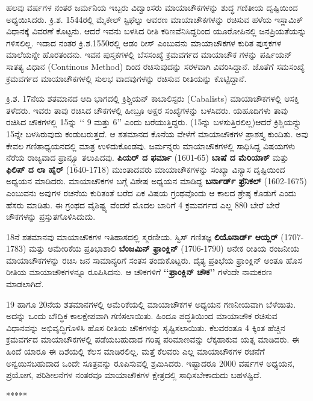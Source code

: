 ಹಲವು ವರ್ಷಗಳ ನಂತರ ಜರ್ಮನಿಯ ಇಬ್ಬರು ವಿದ್ವಾಂಸರು ಮಾಯಾಚೌಕಗಳನ್ನು ಶುದ್ಧ ಗಣಿತೀಯ ದೃಷ್ಟಿಯಿಂದ ಅಧ್ಯಯಿಸಿದರು. ಕ್ರಿ.ಶ. 1544ರಲ್ಲಿ ಮೈಕೇಲ್ ಸ್ಟಿಫೆಲ್ನು ಆವರಣ ಮಾಯಾಚೌಕಗಳನ್ನು ರಚಿಸುವ ಹಳೆಯ ಇಸ್ಲಾಮಿಕ್ ವಿಧಾನಕ್ಕೆ ವಿವರಣೆ ಕೊಟ್ಟನು. ಆದರೆ ಇವನು ಬಳಸಿದ ರೀತಿ ಕಠಿಣವೆನಿಸಿದ್ದರಿಂದ ಯೂರೋಪಿನಲ್ಲಿ ಜನಪ್ರಿಯತೆಯನ್ನು ಗಳಿಸಲಿಲ್ಲ. ಇದಾದ ನಂತರ ಕ್ರಿ.ಶ.1550ರಲ್ಲಿ ಆಡಂ ರೀಸ್ ಎಂಬುವನು ಮಾಯಾಚೌಕಗಳ ಕುರಿತ ಪುಸ್ತಕಗಳ ಮಾಲೆಯನ್ನೇ ಹೊರತಂದನು. ಇವನ ಪುಸ್ತಕಗಳಲ್ಲಿ ಬೆಸಸಂಖ್ಯೆ ಕ್ರಮವರ್ಗದ ಮಾಯಾಚೌಕ ಗಳನ್ನು ಪರ್ಷಿಯನ್ ಸಾತತ್ಯ ವಿಧಾನ (Continous Method) ದಿಂದ ರಚಿಸುವುದನ್ನು ಸರಳವಾಗಿ ವಿವರಿಸಿದ್ದಾನೆ. ಜೊತೆಗೆ ಸಮಸಂಖ್ಯೆ ಕ್ರಮವರ್ಗದ ಮಾಯಾಚೌಕಗಳಲ್ಲಿ ಸುಲಭ ವಾದವುಗಳನ್ನು ರಚಿಸುವ ರೀತಿಯನ್ನು ಕೊಟ್ಟಿದ್ದಾನೆ.

ಕ್ರಿ.ಶ. 17ನೆಯ ಶತಮಾನದ ಆದಿ ಭಾಗದಲ್ಲಿ ಕ್ರಿಶ್ಚಿಯನ್ ಕಾಬಾಲಿಸ್ಟರು (Cabalists) ಮಾಯಾಚೌಕಗಳಲ್ಲಿ ಆಸಕ್ತಿ ತಳೆದರು. ಇವರು ತಾವು ರಚಿಸಿದ ಚೌಕಗಳಲ್ಲಿ ಹೀಬ್ರೂ ಅಕ್ಷರ ಸಂಖ್ಯೆಗಳನ್ನು ಬಳಸಿದರು. ಯಹೂದಿಗಳು ತಾವು ರಚಿಸಿದ ಚೌಕಗಳಲ್ಲಿ 15ನ್ನು ‘‘ 9 ಮತ್ತು 6’’ ಎಂದು ಬರೆಯುತ್ತಿದ್ದರು. (15ನ್ನು ಬಳಸುತ್ತಿರಲಿಲ್ಲ)ಆದರೆ ಕ್ರಿಶ್ಚಿಯನ್ನ್ರು 15ನ್ನೇ ಬಳಸಿರುವುದು ಕಂಡುಬರುತ್ತದೆ. ಆ ಶತಮಾನದ ಕೊನೆಯ ವೇಳೆಗೆ ಮಾಯಾಚೌಕಗಳ ಪ್ರಾಶಸ್ತ್ಯ ಕುಂದಿತು. ಅವು ಕೇವಲ ಗಣಿತಾಧ್ಯಯನದಲ್ಲಿ ಮಾತ್ರ ಉಳಿದುಕೊಂಡವು. ಜರ್ಮನ್ನರು ಮಾಯಾಚೌಕಗಳಲ್ಲಿ ಸಾಧಿಸಿದ್ದ ವಿಷಯಗಳು ನೆರೆಯ ರಾಜ್ಯವಾದ ಫ್ರಾನ್ಸ್ಗೂ ತಲುಪಿದವು. \textbf{ಪಿಯರ್ ದ ಫರ್ಮಾ} (1601-65) \textbf{ಬಾಷೆ ದ ಮೆರಿಯಾಕ್} ಮತ್ತು \textbf{ಫಿಲಿಪ್ ದ ಲಾ ಹೈರ್} (1640-1718) ಮುಂತಾದವರು ಮಾಯಾಚೌಕಗಳನ್ನು ಸಂಖ್ಯಾ ವಿನ್ಯಾಸ ದೃಷ್ಟಿಯಿಂದ ಅಧ್ಯಯನ ಮಾಡಿದರು. ಮಾಯಾಚೌಕಗಳ ಬಗ್ಗೆ ವಿಶೇಷ ಅಧ್ಯಯನ ಮಾಡಿದ್ದ \textbf{ಬರ್ನಾರ್ಡ್ ಫ್ರೆನಿಕಲ್} (1602-1675) ಎಂಬುವನು ಅವುಗಳ ರಚನೆಯ ಕುರಿತಂತೆ ಬರೆದ ಏಕ ವಿಷಯ ಗ್ರಂಥವೊಂದು ಆ ಕಾಲದ ಶ್ರೇಷ್ಠ ಕೊಡುಗೆ ಎಂದು ಹೆಸರು ಮಾಡಿತು. ಈ ಗ್ರಂಥದ ವೈಶಿಷ್ಟ್ಯ ವೆಂದರೆ ಮೊದಲ ಬಾರಿಗೆ 4 ಕ್ರಮವರ್ಗದ ಎಲ್ಲ 880 ಬೇರೆ ಬೇರೆ ಚೌಕಗಳನ್ನು ಪ್ರಸ್ತುತಗೊಳಿಸಿದುದು.

18ನೆ ಶತಮಾನವು ಮಾಯಾಚೌಕಗಳ ಇತಿಹಾಸದಲ್ಲಿ ಸ್ಮರಣೀಯ. ಸ್ವಿಸ್ ಗಣಿತಜ್ಞ \textbf{ಲಿಯೊನಾರ್ಡ್ ಆಯ್ಲರ್} (1707-1783) ಮತ್ತು ಅಮೇರಿಕೆಯ ಪ್ರತಿಭಾಶಾಲಿ \textbf{ಬೆಂಜಮಿನ್ ಫ್ರಾಂಕ್ಲಿನ್} (1706-1790) ಅನೇಕ ರೀತಿಯ ರಂಜನೀಯ ಮಾಯಾಚೌಕಗಳನ್ನು ರಚಿಸಿ ಜನ ಸಾಮಾನ್ಯರಿಗೆ ಸಂತಸ ತಂದುಕೊಟ್ಟರು. ದೈತ್ಯ ಪ್ರತಿಭೆಯ ಫ್ರಾಂಕ್ಲಿನ್ ಅಂತೂ ಹೊಸ ರೀತಿಯ ಮಾಯಾಚೌಕಗಳನ್ನೂ ರೂಪಿಸಿದನು. ಆ ಚೌಕಗಳಿಗೆ \textbf{‘‘ಫ್ರಾಂಕ್ಲಿನ್ ಚೌಕ’’} ಗಳೆಂದೇ ನಾಮಕರಣ ಮಾಡಲಾಗಿದೆ.

19 ಹಾಗೂ 20ನೆಯ ಶತಮಾನಗಳಲ್ಲಿ ಅಮೆರಿಕೆಯಲ್ಲಿ ಮಾಯಾಚೌಕಗಳ ಅಧ್ಯಯನ ಗಣನೀಯವಾಗಿ ಬೆಳೆಯಿತು. ಅದನ್ನು ಒಂದು ಬೌದ್ಧಿಕ ಕಾಲಕ್ಷೇಪವಾಗಿ ಗಣಿಸಲಾಯಿತು. ಹಿಂದೂ ಪದ್ಧತಿಯಿಂದ ಮಾಯಾಚೌಕ ರಚಿಸುವ ವಿಧಾನವನ್ನು ಅಭಿವೃದ್ಧಿಗೊಳಿಸಿ ಹೊಸ ರೀತಿಯ ಚೌಕಗಳನ್ನು ಸೃಷ್ಟಿಸಲಾಯಿತು. ಕೆಲವರಂತೂ 4 ಕ್ಕಿಂತ ಹೆಚ್ಚಿನ ಕ್ರಮವರ್ಗದ ಮಾಯಾಚೌಕಗಳಲ್ಲಿ ಪಡೆಯಬಹುದಾದ ಗರಿಷ್ಠ ಪರಿಮಾಣವನ್ನು ಲೆಕ್ಕಹಾಕುವ ಯತ್ನ ಮಾಡಿದರು. ಈ ಹಿಂದೆ ಯಾರೂ ಈ ದಿಶೆಯಲ್ಲಿ ಕೆಲಸ ಮಾಡಿರಲಿಲ್ಲ. ಮತ್ತೆ ಕೆಲವರು ಎಲ್ಲ ಮಾಯಾಚೌಕಗಳ ರಚನೆಗೆ ಅನ್ವಯಿಸಬಹುದಾದ ಒಂದೇ ಸೂತ್ರವನ್ನು ರೂಪಿಸುವಲ್ಲಿ ಶ್ರಮಿಸಿದರು. ಇಷ್ಟಾದರೂ 2000 ವರ್ಷಗಳ ಅಧ್ಯಯನ, ಪ್ರಯೋಗ, ಪರಿಶೀಲನೆಗಳ ನಂತರವೂ ಮಾಯಾಚೌಕಗಳ ಕ್ಷೇತ್ರದಲ್ಲಿ ಸಾಧಿಸಬೇಕಾದುದು ಬಹಳಷ್ಟಿದೆ.
\begin{center}
*****
\end{center}
